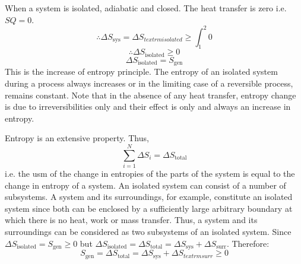 \documentclass[class=report, crop=false, 12pt,a4paper]{standalone}
\begin{document}
When a system is isolated, adiabatic and closed. The heat transfer is zero i.e. \(SQ = 0\).
\[ \therefore \Delta S_{\textrm{sys}} = \Delta S_{textrm{isolated}} \geq \int_1^2 0 \]
\[ \therefore \Delta S_{\textrm{isolated}} \geq 0 \]
\[ \Delta S_{\textrm{isolated}} = S_{\textrm{gen}} \]
This is the increase of entropy principle. The entropy of an isolated system during a process always increases or in the limiting case of a reversible process, remains constant. Note that in the absence of any heat transfer, entropy change is due to irreversibilities only and their effect is only and always an increase in entropy.

Entropy is an extensive property. Thus, 
\[ \sum^N_{i=1} \Delta S_i = \Delta S_{\textrm{total}} \]
i.e. the usm of the change in entropies of the parts of the system is equal to the change in entropy of a system. An isolated system can consist of a number of subsystems. A system and its surroundings, for example, constitute an isolated system since both can be enclosed by a sufficiently large arbitrary boundary at which there is no heat, work or mass transfer. Thus, a system and its surroundings can be considered as two subsystems of an isolated system. Since \( \Delta S_{\textrm{isolated}} = S_{\textrm{gen}} \geq 0 \) but \( \Delta S_{\textrm{isolated}} = \Delta S_{\textrm{total}} = \Delta S_{\textrm{sys}} + \Delta S_{\textrm{surr}} \). Therefore:
\[ S_{\textrm{gen}} = \Delta S_{\textrm{total}} = \Delta S_{\textrm{sys}} + \Delta S_{textrm{surr}} \geq 0 \]
\end{document}
